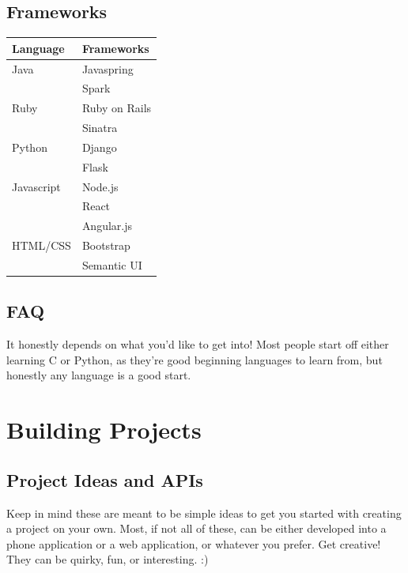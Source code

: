 \documentclass{article}
\begin{document}
\subsection{Frameworks}
\begin{center}
\begin{tabular}{ll}
  \toprule
  \textbf{Language} & \textbf{Frameworks} \\
  \midrule
  Java              & Javaspring \\
                    & Spark \\
  \midrule
  Ruby              & Ruby on Rails \\
                    & Sinatra \\
  \midrule
  Python            & Django \\
                    & Flask \\
  \midrule
  Javascript        & Node.js \\
                    & React \\
                    & Angular.js \\
  \midrule
  HTML/CSS          & Bootstrap \\
                    & Semantic UI \\
  \bottomrule
\end{tabular}
\end{center}

\subsection{FAQ}
\begin{description}[style=nextline]
\item[What language should I learn first?]
  It honestly depends on what you'd like to get into! Most people start off
  either learning C or Python, as they're good beginning languages to learn
  from, but honestly any language is a good start.
\end{description}
\newpage
\section{Building Projects}
\subsection {Project Ideas and APIs}
\label{sec:projects}
Keep in mind these are meant to be simple ideas to get you started with creating
a project on your own. Most, if not all of these, can be either developed into a
phone application or a web application, or whatever you prefer. Get creative!
They can be quirky, fun, or interesting. :)
\end{document}
